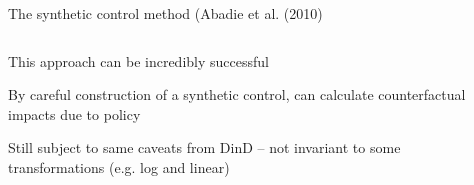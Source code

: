 \documentclass[notes,11pt, aspectratio=169]{beamer}
\newenvironment{wideitemize}{\itemize\addtolength{\itemsep}{10pt}}{\enditemize}
\begin{document}
\begin{frame}{The synthetic control method (Abadie et al. (2010)}
  \begin{columns}[T] %
    \begin{column}{0.5\textwidth}
  \begin{wideitemize}
  \item<1-> This approach can be incredibly successful
  \item<2-> By careful construction of a synthetic control, can
    calculate counterfactual impacts due to policy
  \item<2-> Still subject to same caveats from DinD -- not invariant
    to some transformations (e.g. log and linear)
  \end{wideitemize}
\end{column}
\begin{column}{0.5\textwidth}

\end{column}
\end{columns}
\end{frame}
\end{document}
